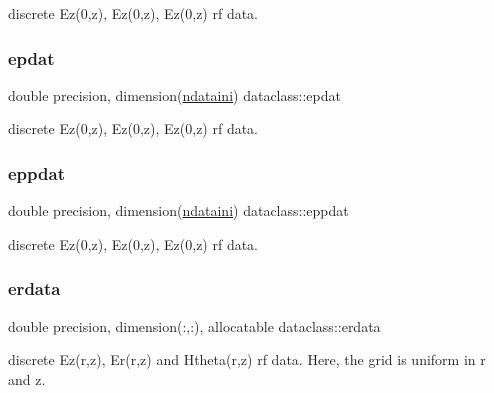 discrete Ez(0,z), Ez\textquotesingle{}(0,z), Ez\textquotesingle{}\textquotesingle{}(0,z) rf data. 

\mbox{\label{namespacedataclass_a2f77b697b14f3e0d557f044ea69402d8}} 
\subsubsection{\texorpdfstring{epdat}{epdat}}
{\footnotesize\ttfamily double precision, dimension(\mbox{\hyperlink{namespacedataclass_a2578bbe9c4dc0892ee08a8619cd7e978}{ndataini}}) dataclass\+::epdat}



discrete Ez(0,z), Ez\textquotesingle{}(0,z), Ez\textquotesingle{}\textquotesingle{}(0,z) rf data. 

\mbox{\label{namespacedataclass_a1c9d30100962693c922470368987ec8a}} 
\subsubsection{\texorpdfstring{eppdat}{eppdat}}
{\footnotesize\ttfamily double precision, dimension(\mbox{\hyperlink{namespacedataclass_a2578bbe9c4dc0892ee08a8619cd7e978}{ndataini}}) dataclass\+::eppdat}



discrete Ez(0,z), Ez\textquotesingle{}(0,z), Ez\textquotesingle{}\textquotesingle{}(0,z) rf data. 

\mbox{\label{namespacedataclass_a4f3abc6db52a89363b184d4bec9ebff8}} 
\subsubsection{\texorpdfstring{erdata}{erdata}}
{\footnotesize\ttfamily double precision, dimension(\+:,\+:), allocatable dataclass\+::erdata}



discrete Ez(r,z), Er(r,z) and Htheta(r,z) rf data. Here, the grid is uniform in r and z. 

\mbox{\label{namespacedataclass_a3379b2d98107a6908aabb71e53031c00}} 
